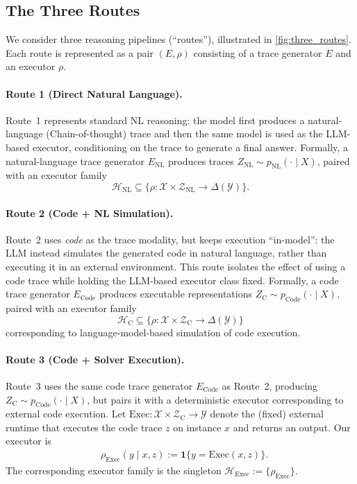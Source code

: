 \subsection{The Three Routes}
\label{def:route}
We consider three reasoning pipelines (``routes''), illustrated in \cref{fig:three_routes}. Each route is represented as a pair $(E,\rho)$ consisting of a trace generator $E$ and an executor $\rho$.
\paragraph{Route 1 (Direct Natural Language).}
Route~1 represents standard NL reasoning: the model first produces a natural-language (Chain-of-thought) trace and then the same model is used as the LLM-based executor, conditioning on the trace to generate a final answer. Formally, a natural-language trace generator $E_{\mathrm{NL}}$ produces traces
$Z_{\mathrm{NL}} \sim p_{\mathrm{NL}}(\cdot \mid X)$,
paired with an executor family
\[
\mathcal{H}_{\mathrm{NL}}
\subseteq
\{ \rho : \mathcal{X} \times \mathcal{Z}_{\mathrm{NL}} \to \Delta(\mathcal{Y}) \}.
\]
\paragraph{Route 2 (Code + NL Simulation).}
Route~2 uses \emph{code} as the trace modality, but keeps execution ``in-model'': the LLM instead simulates the generated code in natural language, rather than executing it in an external environment. This route isolates the effect of using a code trace while holding the LLM-based executor class fixed. Formally, a code trace generator $E_{\mathrm{Code}}$ produces executable representations
$Z_{\mathrm{C}} \sim p_{\mathrm{Code}}(\cdot \mid X)$,
paired with an executor family
\[
\mathcal{H}_{\mathrm{C}}
\subseteq
\{ \rho : \mathcal{X} \times \mathcal{Z}_{\mathrm{C}} \to \Delta(\mathcal{Y}) \}
\]
corresponding to language-model-based simulation of code execution.
\paragraph{Route 3 (Code + Solver Execution).}
Route~3 uses the same code trace generator $E_{\mathrm{Code}}$ as Route~2, producing
$Z_{\mathrm{C}} \sim p_{\mathrm{Code}}(\cdot \mid X)$,
but pairs it with a deterministic executor corresponding to external code execution.
Let $\mathrm{Exec} : \mathcal{X} \times \mathcal{Z}_{\mathrm{C}} \to \mathcal{Y}$ denote the (fixed) external runtime
that executes the code trace $z$ on instance $x$ and returns an output.
Our executor is
\begin{align*}
& \rho_{\mathrm{Exec}}(y \mid x,z) := \mathbf{1}\{y = \mathrm{Exec}(x,z)\}.
\end{align*}
The corresponding executor family is the singleton $\mathcal{H}_{\mathrm{Exec}} := \{\rho_{\mathrm{Exec}}\}.$

